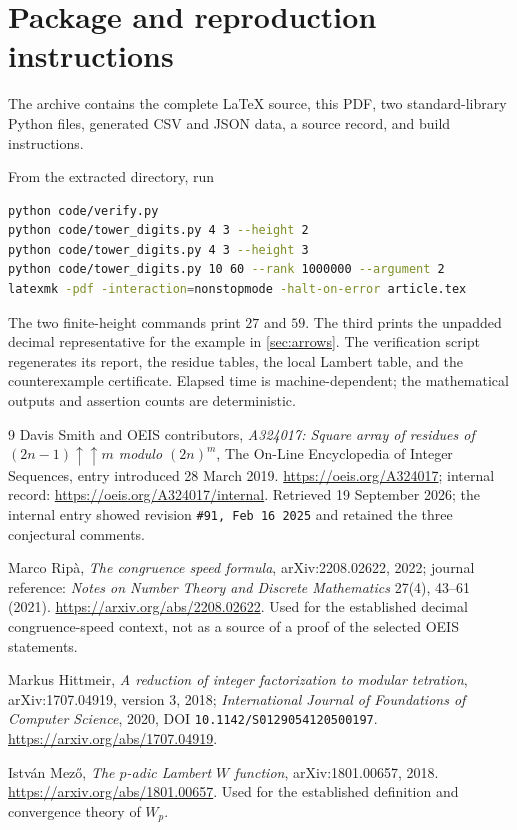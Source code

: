 \documentclass[11pt,a4paper]{article}
\numberwithin{equation}{section}
\theoremstyle{plain}
\theoremstyle{definition}
\begin{document}
\section{Package and reproduction instructions}
The archive contains the complete \LaTeX{} source, this PDF, two
standard-library Python files, generated CSV and JSON data, a source
record, and build instructions. 

From the extracted directory, run
\begin{lstlisting}[language=bash]
python code/verify.py
python code/tower_digits.py 4 3 --height 2
python code/tower_digits.py 4 3 --height 3
python code/tower_digits.py 10 60 --rank 1000000 --argument 2
latexmk -pdf -interaction=nonstopmode -halt-on-error article.tex
\end{lstlisting}
The two finite-height commands print $27$ and $59$.  The third prints
the unpadded decimal representative for the example in
\cref{sec:arrows}.  The verification script regenerates its report,
the residue tables, the local Lambert table, and the counterexample
certificate.  Elapsed time is machine-dependent; the mathematical
outputs and assertion counts are deterministic.

\begin{thebibliography}{9}
Davis Smith and OEIS contributors,
\emph{A324017: Square array of residues of $(2n-1)\uparrow\uparrow m$
modulo $(2n)^m$}, The On-Line Encyclopedia of Integer Sequences,
entry introduced 28 March 2019.
\url{https://oeis.org/A324017}; internal record:
\url{https://oeis.org/A324017/internal}.
Retrieved 19 September 2026; the internal entry showed revision
\texttt{\#91, Feb 16 2025} and retained the three conjectural comments.

Marco Rip\`a,
\emph{The congruence speed formula},
arXiv:2208.02622, 2022; journal reference:
\emph{Notes on Number Theory and Discrete Mathematics} 27(4), 43--61 (2021).
\url{https://arxiv.org/abs/2208.02622}.
Used for the established decimal congruence-speed context, not as a
source of a proof of the selected OEIS statements.

Markus Hittmeir,
\emph{A reduction of integer factorization to modular tetration},
arXiv:1707.04919, version 3, 2018;
\emph{International Journal of Foundations of Computer Science}, 2020,
DOI \texttt{10.1142/S0129054120500197}.
\url{https://arxiv.org/abs/1707.04919}.

Istv\'an Mez\H{o},
\emph{The $p$-adic Lambert $W$ function},
arXiv:1801.00657, 2018.
\url{https://arxiv.org/abs/1801.00657}.
Used for the established definition and convergence theory of $W_p$.
\end{thebibliography}
\end{document}
